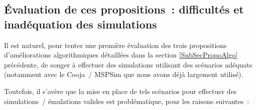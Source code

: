 \subsection{\'Evaluation de ces propositions~: difficultés et
            inadéquation des simulations}
\label{SubSecEvalAlgoSimu}

Il est naturel, pour tenter une première évaluation des trois
propositions d'améliorations algorithmiques détaillées dans la section
\ref{SubSecPropoAlgo} précédente, de songer à effectuer des simulations
utilisant des scénarios adéquats (notamment avec le  Cooja~/
MSPSim que nous avons déjà largement utilisé).

Toutefois, il s'avère que la mise en place de tels scénarios pour effectuer
des simulations~/ émulations valides est problématique, pour les raisons
suivantes~:

